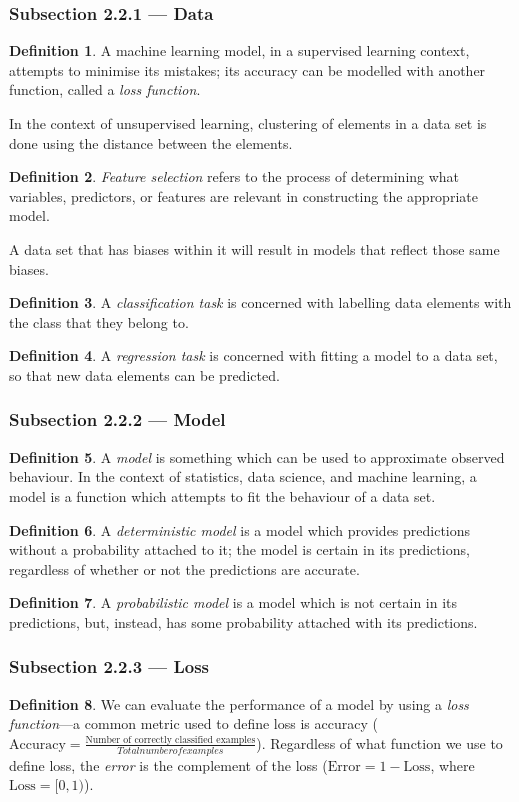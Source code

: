 \documentclass{article}
\theoremstyle{definition}
\newtheorem{definition}{Definition}[section]
\begin{document}
\subsubsection{Subsection 2.2.1 --- Data}
\begin{definition}
    A machine learning model, in a supervised learning context, attempts to minimise its mistakes; its accuracy can be modelled with another function, called a \emph{loss function}.
\end{definition}
In the context of unsupervised learning, clustering of elements in a data set is done using the distance between the elements.
\begin{definition}
    \emph{Feature selection} refers to the process of determining what variables, predictors, or features are relevant in constructing the appropriate model.
\end{definition}
A data set that has biases within it will result in models that reflect those same biases.
\begin{definition}
    A \emph{classification task} is concerned with labelling data elements with the class that they belong to.
\end{definition}
\begin{definition}
    A \emph{regression task} is concerned with fitting a model to a data set, so that new data elements can be predicted.
\end{definition}

\subsubsection{Subsection 2.2.2 --- Model}
\begin{definition}
    A \emph{model} is something which can be used to approximate observed behaviour. In the context of statistics, data science, and machine learning, a model is a function which attempts to fit the behaviour of a data set.
\end{definition}
\begin{definition}
    A \emph{deterministic model} is a model which provides predictions without a probability attached to it; the model is certain in its predictions, regardless of whether or not the predictions are accurate.
\end{definition}
\begin{definition}
    A \emph{probabilistic model} is a model which is not certain in its predictions, but, instead, has some probability attached with its predictions.
\end{definition}

\subsubsection{Subsection 2.2.3 --- Loss}
\begin{definition}
    We can evaluate the performance of a model by using a \emph{loss function}---a common metric used to define loss is accuracy ($\mathrm{Accuracy} = \frac{\text{Number of correctly classified examples}}{Total number of examples}$). Regardless of what function we use to define loss, the \emph{error} is the complement of the loss ($\mathrm{Error} = 1 - \mathrm{Loss}$, where $\mathrm{Loss} = [0, 1)$).
\end{definition}
\end{document}

